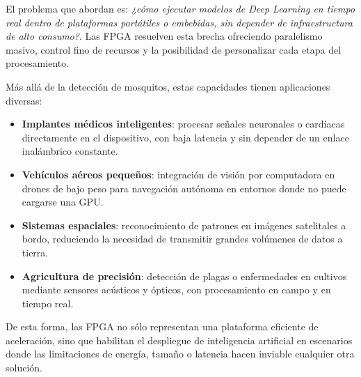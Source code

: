 El problema que abordan es: \textit{¿cómo ejecutar modelos de Deep Learning en tiempo real dentro de plataformas 
	portátiles o embebidas, sin depender de infraestructura de alto consumo?}.  
Las FPGA resuelven esta brecha ofreciendo paralelismo masivo, control fino de recursos y la posibilidad 
de personalizar cada etapa del procesamiento.

Más allá de la detección de mosquitos, estas capacidades tienen aplicaciones diversas:
\begin{itemize}
	\item \textbf{Implantes médicos inteligentes}: procesar señales neuronales o cardíacas directamente en el dispositivo, con baja latencia y sin depender de un enlace inalámbrico constante.  
	\item \textbf{Vehículos aéreos pequeños}: integración de visión por computadora en drones de bajo peso para navegación autónoma en entornos donde no puede cargarse una GPU.  
	\item \textbf{Sistemas espaciales}: reconocimiento de patrones en imágenes satelitales a bordo, reduciendo la necesidad de transmitir grandes volúmenes de datos a tierra.  
	\item \textbf{Agricultura de precisión}: detección de plagas o enfermedades en cultivos mediante sensores acústicos y ópticos, con procesamiento en campo y en tiempo real.  
\end{itemize}

De esta forma, las FPGA no sólo representan una plataforma eficiente de aceleración, 
sino que habilitan el despliegue de inteligencia artificial en escenarios donde las limitaciones 
de energía, tamaño o latencia hacen inviable cualquier otra solución.

